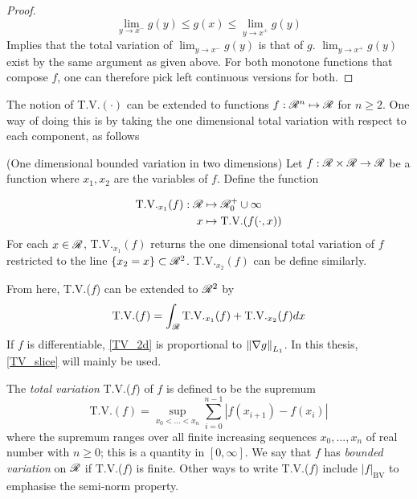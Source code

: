 \begin{definition}
\begin{proof}
	 \begin{equation}
	 	\lim_{y \rightarrow x^-} g(y) \leq g(x) \leq \lim_{y \rightarrow x^+} g(y) \label{montone_left_right_lim2}
	 \end{equation}
 	Implies that the total variation of $\lim_{y \rightarrow x^-} g(y)$ is that of $g$. $\lim_{y \rightarrow x^+} g(y)$ exist by the same argument as given above. For both monotone functions that compose $f$, one can therefore pick left continuous versions for both.
 	
\end{proof}
The notion of T.V.$(\cdot)$ can be extended to functions $f:\mathscr{R}^n \mapsto \mathscr{R}$ for $n \geq 2$. One way of doing this is by taking the one dimensional total variation with respect to each component, as follows

\begin{definition}(One dimensional bounded variation in two dimensions)
	Let $f : \mathscr{R}\times\mathscr{R} \rightarrow \mathscr{R}$ be a function where $x_1, x_2$ are the variables of $f$. Define the function 
	
	\begin{align} \label{TV_slice}
		\text{T.V.}_{x_1}(f) : \mathscr{R} &\mapsto \mathscr{R}^+_0 \cup \infty \\ 	
		x &\mapsto \text{T.V.}(f(\cdot, x)) \nonumber
	\end{align}
	 For each $x \in \mathscr{R}$, $\text{T.V.}_{x_1}(f)$ returns the one dimensional total variation of $f$ restricted to the line $\{x_2 = x\} \subset \mathscr{R}^2$.  $\text{T.V.}_{x_2}(f)$ can be define similarly. 
\end{definition} 

\begin{remark}
	From here, T.V.($f$) can be extended to $\mathscr{R}^2$ by
	\begin{equation} \label{TV_2d}
		\text{T.V.}(f) = \int_{\mathscr{R}} \text{T.V.}_{x_1}(f) + \text{T.V.}_{x_2}(f) dx
	\end{equation}
	   If $f$ is differentiable, \eqref{TV_2d} is proportional to $\left\lVert\nabla g\right\rVert_{L_1}$. In this thesis, \eqref{TV_slice} will mainly be used. 
\end{remark}
	
	
	The \emph{total variation} T.V.($f$) of $f$ is defined to be the supremum
	\begin{equation}
		\text{T.V.}(f) = \sup_{x_0 < ... < x_n} \sum_{i = 0}^{n-1} \left| f(x_{i+1}) - f(x_i)\right|
	\end{equation} 
	where the supremum ranges over all finite increasing sequences $x_0, ..., x_n$ of real number with $n \geq 0$; this is a quantity in $[0, \infty]$. We say that $f$ has \emph{bounded variation} on $\mathscr{R}$ if T.V.($f$) is finite. Other ways to write T.V.($f$) include $\left|f\right|_{\text{BV}}$ to emphasise the semi-norm property.


\end{definition}
